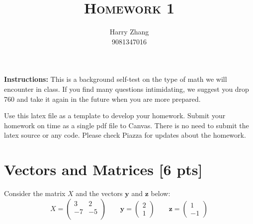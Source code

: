 \documentclass[a4paper]{article}
\title{\textsc{Homework 1}} %
\author{
	Harry Zhang\\
	9081347016\\
}
\date{}
\theoremstyle{definition}
\begin{document}
	
	\maketitle 
	
	
	\textbf{Instructions:} 
	This is a background self-test on the type of math we will encounter in class. If you find many questions intimidating, we suggest you drop 760 and take it again in the future when you are more prepared.
	
	Use this latex file as a template to develop your homework.
	Submit your homework on time as a single pdf file to Canvas.
	There is no need to submit the latex source or any code.
	Please check Piazza for updates about the homework.
	
	
	\section{Vectors and Matrices [6 pts]}
	Consider the matrix $X$ and the vectors $\mathbf{y}$ and $\textbf{z}$ below:
	$$
	X = \begin{pmatrix}
		3 & 2 \\ -7 & -5 \\
	\end{pmatrix}
	\qquad \mathbf{y} = \begin{pmatrix}
		2 \\ 1
	\end{pmatrix} \qquad \mathbf{z} = \begin{pmatrix}
		1 \\ -1
	\end{pmatrix}
	$$
\end{document}

